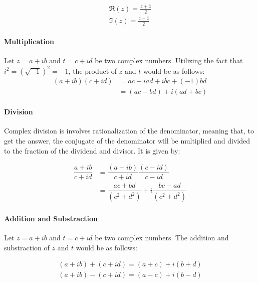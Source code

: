 \begin{equation}
\begin{aligned}
\Re(z)= \frac{z+\bar{z}}{2}\\
\Im(z)= \frac{z-\bar{z}}{2}
\end{aligned}
\end{equation}

\paragraph{Multiplication}
Let $z = a+ib$ and $t=c+id$ be two complex numbers. Utilizing the fact that $i^{2}=(\sqrt{-1})^2=-1$, the product of $z$ and $t$ would be as follows:
\begin{equation}
\begin{aligned}
(a+ib)(c+id)  &= ac+iad+ibc+(-1)bd\\
&= (ac-bd)+i(ad+bc)
\end{aligned}
\end{equation}

\paragraph{Division}
Complex division is involves rationalization of the denominator, meaning that, to get the answer, the conjugate of the denominator will be multiplied and divided to the fraction of the dividend and divisor. It is given by:

\begin{equation}
\begin{aligned}
\dfrac{a+ib}{c+id} &= \dfrac{(a+ib)}{c+id}\dfrac{(c-id)}{c-id}\\
&= \dfrac{ac+bd}{(c^2+d^2)}+i\dfrac{bc-ad}{(c^2+d^2)}
\end{aligned}
\end{equation}

\paragraph{Addition and Substraction}
Let $z = a+ib$ and $t=c+id$ be two complex numbers. The addition and substraction of $z$ and $t$ would be as follows:

\begin{equation}
\begin{aligned}
(a+ib) + (c+id)  = (a+c)+i(b+d)\\
(a+ib) - (c+id)  = (a-c)+i(b-d)
\end{aligned}
\end{equation}

